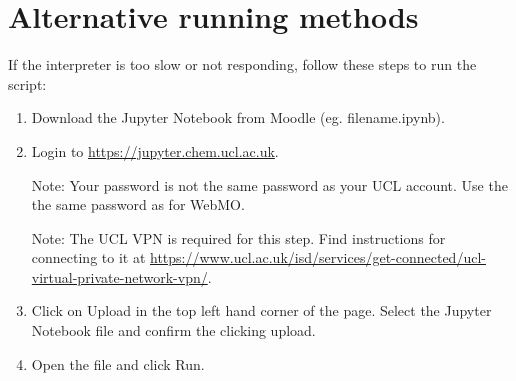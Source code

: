 \documentclass{article}
\begin{document}
\section{Alternative running methods}
If the interpreter is too slow or not responding, follow these steps to run the script:
\begin{enumerate}
\item Download the Jupyter Notebook from Moodle (eg. filename.ipynb).

\item Login to \href{https://jupyter.chem.ucl.ac.uk}{https://jupyter.chem.ucl.ac.uk}. 

Note: Your password is not the same password as your UCL account. Use the the same password as for WebMO.

Note: The UCL VPN is required for this step. Find instructions for connecting to it at \href{https://www.ucl.ac.uk/isd/services/get-connected/ucl-virtual-private-network-vpn/}{https://www.ucl.ac.uk/isd/services/get-connected/ucl-virtual-private-network-vpn/}.

\item Click on Upload in the top left hand corner of the page. Select the Jupyter Notebook file and confirm the clicking upload.
\item Open the file and click Run.
\end{enumerate}
\end{document}
